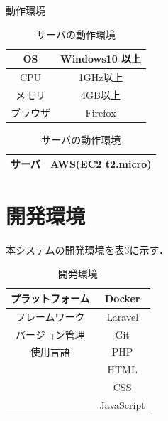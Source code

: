 \documentclass[a4paper, titlepage]{jsarticle}
\begin{document}
\begin{table}[H]
  \begin{minipage}{0.45\linewidth}
    \centering
    \caption{動作環境}
    \label{tab:OpEnv}
    \begin{tabular}{c|c} \hline
      OS & Windows10 以上 \\ \hline
      CPU & 1GHz以上 \\ \hline
      メモリ & 4GB以上 \\ \hline
      ブラウザ & Firefox \\ \hline
    \end{tabular}
  \end{minipage}
  \begin{minipage}{0.45\linewidth}
    \centering
    \caption{サーバの動作環境}
    \label{tab:ServerEnv}
    \begin{tabular}{c|c} \hline
      サーバ & AWS(EC2 t2.micro) \\ \hline
    \end{tabular}
  \end{minipage}
\end{table}

\section{開発環境}
本システムの開発環境を表\ref{tab:DevEnv}に示す．
\begin{table}[H]
  \centering
  \caption{開発環境}
  \label{tab:DevEnv}
  \begin{tabular}{c|c} \hline
    プラットフォーム & Docker \\ \hline
    フレームワーク & Laravel \\ \hline
    バージョン管理 & Git \\ \hline
    使用言語 & PHP \\
    & HTML \\
    & CSS \\
    & JavaScript \\ \hline
  \end{tabular}
\end{table}
\end{document}
